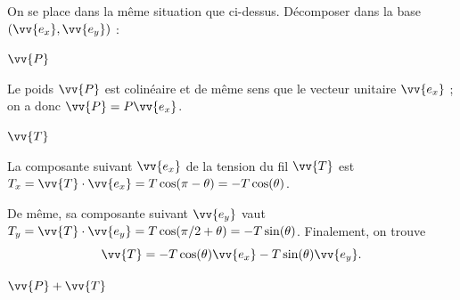 On se place dans la même situation que ci-dessus.
Décomposer dans la base $(\vv{e_x}, \vv{e_y})$ : 

\smallskip

\debutEntrainement

\begin{enonce}
	$\vv{P}$
\end{enonce}


\begin{corrige}
  Le poids $\vv{P}$ est colinéaire et de même sens que le vecteur unitaire $\vv{e_x}$ ; on a donc $\vv{P}=P\vv{e_x}$.
\end{corrige}


\begin{enonce}
	$\vv{T}$
\end{enonce}


\begin{corrige}
La composante suivant $\vv{e_x}$ de la tension du fil $\vv{T}$ est $T_x=\vv{T}\cdot \vv{e_x}=T\cos(\pi-\theta)=-T\cos(\theta)$. 

De même, sa composante suivant $\vv{e_y}$ vaut $T_y=\vv{T}\cdot \vv{e_y}=T\cos(\pi/2+\theta)=-T\sin(\theta)$. Finalement, on trouve 
\[
\vv{T}=-T\cos(\theta)\vv{e_x}-T\sin(\theta)\vv{e_y}.
\]
\end{corrige}


\begin{enonce}
	$\vv{P}+\vv{T}$
\end{enonce}



